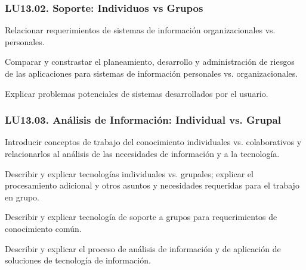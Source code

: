 \subsubsection{LU13.02. Soporte: Individuos vs Grupos}\label{sec:BOK-LU13.02}\label{sec:LU13.02}
\begin{LearningUnit}
\begin{LUGoal}
\item Relacionar requerimientos de sistemas de información organizacionales vs. personales.
\end{LUGoal}

\begin{LUObjective}
\item Comparar y constrastar el planeamiento, desarrollo y administración de riesgos de las aplicaciones para sistemas de información personales vs. organizacionales.
\item Explicar problemas potenciales de sistemas desarrollados por el usuario.
\end{LUObjective}
\end{LearningUnit}

\subsubsection{LU13.03. Análisis de Información: Individual vs. Grupal}\label{sec:BOK-LU13.03}\label{sec:LU13.03}
\begin{LearningUnit}
\begin{LUGoal}
\item Introducir conceptos de trabajo del conocimiento individuales vs. colaborativos y relacionarlos al análisis de las necesidades de información y a la tecnología.
\end{LUGoal}

\begin{LUObjective}
\item Describir y explicar tecnologías individuales vs. grupales; explicar el procesamiento adicional y otros asuntos y necesidades requeridas para el trabajo en grupo.
\item Describir y explicar tecnología de soporte a grupos para requerimientos de conocimiento común.
\item Describir y explicar el proceso de análisis de información y de aplicación de soluciones de tecnología de información.
\end{LUObjective}
\end{LearningUnit}

